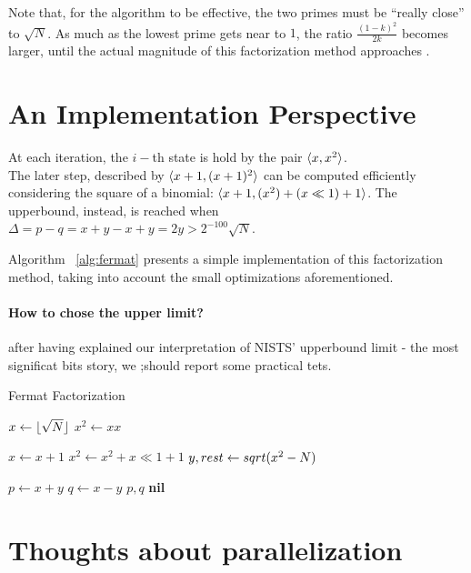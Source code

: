 \begin{remark}
  Note that, for the algorithm to be effective, the two primes must be
  ``really close'' to $\sqrt{N}$. As much as the lowest prime gets near to
  $1$, the ratio $\frac{(1-k)^2}{2k}$ becomes larger, until the actual magnitude
  of this factorization method approaches .
\end{remark}

\section{An Implementation Perspective}

At each iteration, the $i-$th state is hold by the pair $\langle x, x^2\rangle$.\\
The later step, described by $\langle x+1, (x+1)^2\rangle$ can be computed efficiently
considering the square of a binomial: $\langle x+1, (x^2) + (x \ll 1) + 1\rangle$.
The upperbound, instead, is reached when
$ \Delta = p - q  = x + y - x + y = 2y > 2^{-100}\sqrt{N}$.

Algorithm ~\ref{alg:fermat} presents a simple implementation of this
factorization method, taking into account the small optimizations
aforementioned.

\paragraph{How to chose the upper limit?}  after having explained our interpretation
of NISTS' upperbound limit - the most significat bits story, we ;should report
some practical tets.

\begin{algorithm}
  \caption{Fermat Factorization \label{alg:fermat}}
  \begin{algorithmic}[1]
    \State $x \gets \lfloor\sqrt{N}\rfloor$
    \State $x^2 \gets xx$

    \Repeat
    \State $x \gets x+1$
    \State $x^2 \gets x^2 + x \ll 1 + 1$
    \State $y, rest \gets sqrt(x^2 - N)$

    \State $p \gets x+y$
    \State $q \gets x-y$
    \State \Return $p, q$
    \Else
    \State \Return \textbf{nil}
    \EndIf
    \end{algorithmic}
\end{algorithm}


\section{Thoughts about parallelization}


